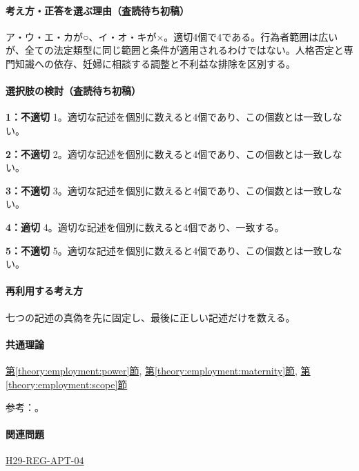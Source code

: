\paragraph{考え方・正答を選ぶ理由（査読待ち初稿）} ア・ウ・エ・カが○、イ・オ・キが×。適切4個で4である。行為者範囲は広いが、全ての法定類型に同じ範囲と条件が適用されるわけではない。人格否定と専門知識への依存、妊婦に相談する調整と不利益な排除を区別する。

\paragraph{選択肢の検討（査読待ち初稿）}\mbox{}\par

\noindent\textbf{1：不適切} 1。適切な記述を個別に数えると4個であり、この個数とは一致しない。\par

\noindent\textbf{2：不適切} 2。適切な記述を個別に数えると4個であり、この個数とは一致しない。\par

\noindent\textbf{3：不適切} 3。適切な記述を個別に数えると4個であり、この個数とは一致しない。\par

\noindent\textbf{4：適切} 4。適切な記述を個別に数えると4個であり、一致する。\par

\noindent\textbf{5：不適切} 5。適切な記述を個別に数えると4個であり、この個数とは一致しない。\par

\paragraph{再利用する考え方} 七つの記述の真偽を先に固定し、最後に正しい記述だけを数える。

\paragraph{共通理論} \hyperref[theory:employment:power]{第\ref*{theory:employment:power}節}, \hyperref[theory:employment:maternity]{第\ref*{theory:employment:maternity}節}, \hyperref[theory:employment:scope]{第\ref*{theory:employment:scope}節}

\par 参考：\cite{employment_power2012,employment_power_current,employment_sexual_current,employment_sexual2018,employment_sexual2018}。

\paragraph{関連問題} \hyperref[q:h29-reg-apt-04]{H29-REG-APT-04}

